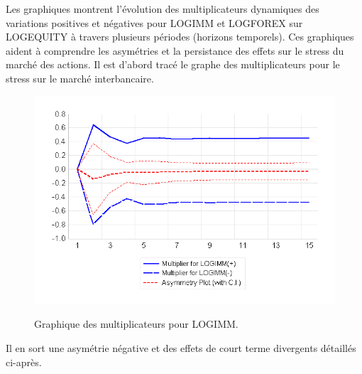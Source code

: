 Les graphiques montrent l’évolution des multiplicateurs dynamiques des variations positives et négatives pour LOGIMM et LOGFOREX sur LOGEQUITY à travers plusieurs périodes (horizons temporels). Ces graphiques aident à comprendre les asymétries et la persistance des effets sur le stress du marché des actions. Il est d'abord tracé le graphe des multiplicateurs pour le stress sur le marché interbancaire.

\begin{figure}[H]
    \centering
    \caption{Graphique des multiplicateurs pour LOGIMM.}
    \includegraphics{figures/multiplier_logimm.png}
    \label{fig:multiplier_logimm}
\end{figure}

Il en sort une asymétrie négative et des effets de court terme divergents détaillés ci-après.

